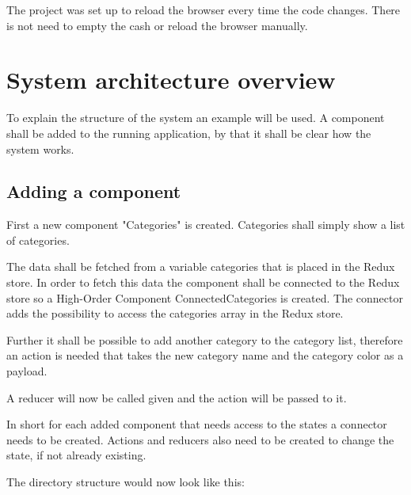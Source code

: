 The project was set up to reload the browser every time 
the code changes. There is not need to empty the cash or reload the browser manually.


\section{System architecture overview}

To explain the structure of the system an example will be used. A component shall be added to the running application,
by that it shall be clear how the system works.

\subsection{Adding a component}
First a new component "Categories" is created. Categories shall simply show a list of categories. 



The data shall be fetched from a variable categories that is
placed in the Redux store.
In order to fetch this data the component shall be connected to the Redux store so a High-Order Component ConnectedCategories is created.
The connector adds the possibility to access the categories array in the Redux store.



Further it shall be possible to add another category to the category list, therefore an action is needed that takes the new category name and the category color as a payload.



A reducer will now be called given and the action will be passed to it.




In short for each added component that needs access to the states a connector needs to be created. Actions and reducers also need to be created to change the state, if not already existing.

The directory structure would now look like this:


